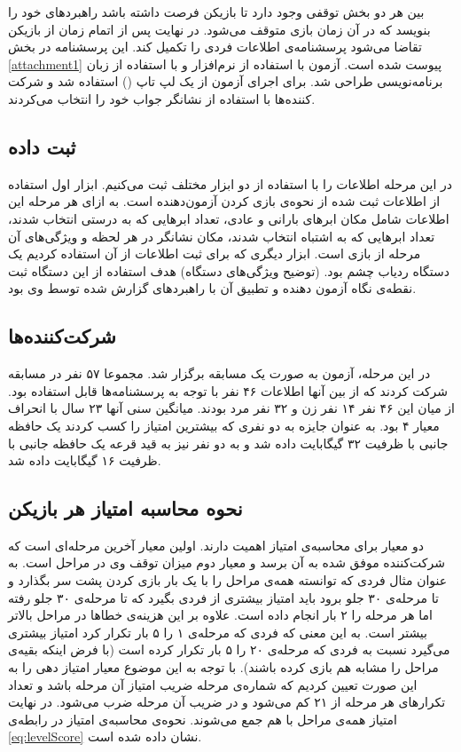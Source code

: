 \documentclass[twoside, a4paper,11pt]{book}
\numberwithin{equation}{chapter}
\numberwithin{table}{chapter}
\numberwithin{figure}{chapter}
\numberwithin{equation}{chapter}
\begin{document}
بین هر دو بخش توقفی وجود دارد تا بازیکن فرصت داشته باشد راهبرد‌های خود را بنویسد که در آن زمان بازی متوقف می‌شود. در نهایت پس از اتمام زمان از بازیکن تقاضا می‌شود پرسشنامه‌ی اطلاعات فردی را تکمیل کند. این پرسشنامه در بخش \ref{attachment1} پیوست شده است.
آزمون با استفاده از نرم‌افزار  و با استفاده از زبان برنامه‌نویسی   طراحی شد. برای اجرای آزمون از یک لپ تاپ () استفاده شد و شرکت کننده‌ها با استفاده از نشانگر جواب خود را انتخاب می‌کردند.

\subsection{ثبت داده}
در این مرحله اطلاعات را با استفاده از دو ابزار مختلف ثبت می‌کنیم. ابزار اول استفاده از اطلاعات ثبت شده از نحوه‌ی بازی کردن آزمون‌دهنده است. به ازای هر مرحله این اطلاعات شامل مکان ابرهای بارانی و عادی، تعداد ابرهایی که به درستی انتخاب شدند، تعداد ابرهایی که به اشتباه انتخاب شدند، مکان نشانگر در هر لحظه و ویژگی‌های آن مرحله از بازی است.
ابزار دیگری که برای ثبت اطلاعات از آن استفاده کردیم یک دستگاه ردیاب چشم بود. (توضیح ویژگی‌های دستگاه) هدف استفاده از این دستگاه ثبت نقطه‌ی نگاه آزمون دهنده و تطبیق آن با راهبرد‌های گزارش شده توسط وی بود.

\subsection{شرکت‌کننده‌ها}
در این مرحله، آزمون به صورت یک مسابقه برگزار شد. مجموعا ۵۷ نفر در مسابقه شرکت کردند که از بین آنها اطلاعات ۴۶ نفر با توجه به پرسشنامه‌ها قابل استفاده بود. از میان این ۴۶ نفر ۱۴ نفر زن و ۳۲ نفر مرد بودند. میانگین سنی آنها ۲۳ سال با انحراف معیار ۴ بود. به عنوان جایزه به دو نفری که بیشترین امتیاز را کسب کردند یک حافظه جانبی با ظرفیت ۳۲ گیگابایت داده شد و به دو نفر نیز به قید قرعه یک حافظه جانبی با ظرفیت ۱۶ گیگابایت داده شد.

\subsection{نحوه محاسبه امتیاز هر بازیکن}
دو معیار برای محاسبه‌ی امتیاز اهمیت دارند. اولین معیار آخرین مرحله‌ای است که شرکت‌کننده موفق شده به آن برسد و معیار دوم میزان توقف وی در مراحل است. به عنوان مثال فردی که توانسته همه‌ی مراحل را با یک بار بازی کردن پشت سر بگذارد و تا مرحله‌ی ۳۰ جلو برود باید امتیاز بیشتری از فردی بگیرد که تا مرحله‌ی ۳۰ جلو رفته اما هر مرحله را ۲ بار انجام داده است.
علاوه بر این هزینه‌ی خطاها در مراحل بالاتر بیشتر است. به این معنی که فردی که مرحله‌ی ۱ را ۵ بار تکرار کرد امتیاز بیشتری می‌گیرد نسبت به فردی که مرحله‌ی ۲۰ را ۵ بار تکرار کرده است (با فرض اینکه بقیه‌ی مراحل را مشابه هم بازی کرده باشند).
با توجه به این موضوع معیار امتیاز دهی را به این صورت تعیین کردیم که شماره‌ی مرحله ضریب امتیاز آن مرحله باشد و تعداد تکرارهای هر مرحله از ۲۱ کم می‌شود و در ضریب آن مرحله ضرب می‌شود. در نهایت امتیاز همه‌ی مراحل با هم جمع می‌شوند. نحوه‌ی محاسبه‌ی امتیاز در رابطه‌ی \ref{eq:levelScore} نشان داده شده است.
\end{document}
